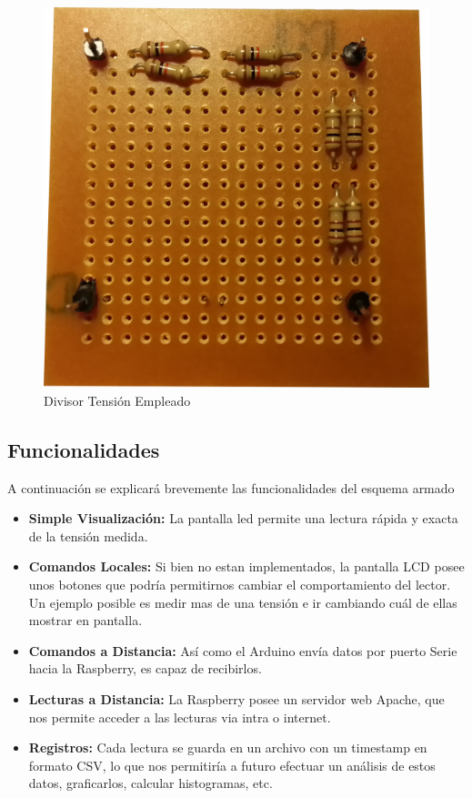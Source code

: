 \documentclass[12pt,a4paper]{article}
\begin{document}
			\begin{figure}[H]
			\centering
				\includegraphics[scale=0.1]{images/div.jpg}\caption{Divisor Tensión Empleado}
			\end{figure}

		\subsection{Funcionalidades}\label{sec:func}

			A continuación se explicará brevemente las funcionalidades del esquema armado

			\begin{itemize}
				\item \textbf{Simple Visualización:} La pantalla led permite una lectura rápida y exacta de la tensión medida.
				\item \textbf{Comandos Locales:} Si bien no estan implementados, la pantalla LCD posee unos botones que podría permitirnos cambiar el comportamiento del lector. Un ejemplo posible es medir mas de una tensión e ir cambiando cuál de ellas mostrar en pantalla.
				\item \textbf{Comandos a Distancia:} Así como el Arduino envía datos por puerto Serie hacia la Raspberry, es capaz de recibirlos.
				\item \textbf{Lecturas a Distancia:} La Raspberry posee un servidor web Apache, que nos permite acceder a las lecturas via intra o internet.
				\item \textbf{Registros:} Cada lectura se guarda en un archivo con un timestamp en formato CSV, lo que nos permitiría a futuro efectuar un análisis de estos datos, graficarlos, calcular histogramas, etc.
			\end{itemize}
\end{document}
